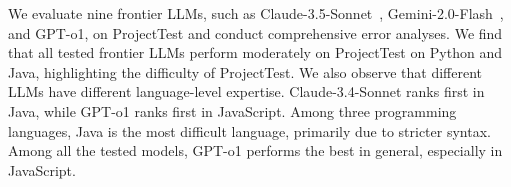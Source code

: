 We evaluate nine frontier LLMs, such as Claude-3.5-Sonnet~\cite{anthropic2024claude}, Gemini-2.0-Flash~\cite{team2024gemini}, and GPT-o1, on ProjectTest and conduct comprehensive error analyses. We find that all tested frontier LLMs perform moderately on ProjectTest on Python and Java, highlighting the difficulty of ProjectTest.
We also observe that different LLMs have different language-level expertise. Claude-3.4-Sonnet ranks first in Java, while GPT-o1 ranks first in JavaScript.
Among three programming languages, Java is the most difficult language, primarily due to stricter syntax.  Among all the tested models, GPT-o1 performs the best in general, especially in JavaScript. 

